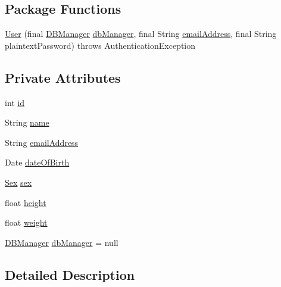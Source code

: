 \subsection*{Package Functions}
\begin{DoxyCompactItemize}
\item 
\hyperlink{classcom_1_1activitytracker_1_1_user_ae9f2a2555aa41e80ade28223907e01ab}{User} (final \hyperlink{classcom_1_1activitytracker_1_1_d_b_manager}{D\+B\+Manager} \hyperlink{classcom_1_1activitytracker_1_1_user_a8c8b36433447a235f2b4940b92e839c1}{db\+Manager}, final String \hyperlink{classcom_1_1activitytracker_1_1_user_ac2fdb9a858d0295e52c5f8bc179e3137}{email\+Address}, final String plaintext\+Password)  throws Authentication\+Exception
\end{DoxyCompactItemize}
\subsection*{Private Attributes}
\begin{DoxyCompactItemize}
\item 
int \hyperlink{classcom_1_1activitytracker_1_1_user_adc05319380c2cbb37477ab5aab86317c}{id}
\item 
String \hyperlink{classcom_1_1activitytracker_1_1_user_a49bfb4c8ebf8b7a377df01b5f0b2d7bc}{name}
\item 
String \hyperlink{classcom_1_1activitytracker_1_1_user_ac2fdb9a858d0295e52c5f8bc179e3137}{email\+Address}
\item 
Date \hyperlink{classcom_1_1activitytracker_1_1_user_a40b0d4ce16246066c0e948edef864d94}{date\+Of\+Birth}
\item 
\hyperlink{enumcom_1_1activitytracker_1_1_user_1_1_sex}{Sex} \hyperlink{classcom_1_1activitytracker_1_1_user_adcbddd2e965af4e227f7cf0582a3e13d}{sex}
\item 
float \hyperlink{classcom_1_1activitytracker_1_1_user_a83cdfe6f520a4e18e8710e8e11f8c3d6}{height}
\item 
float \hyperlink{classcom_1_1activitytracker_1_1_user_a8a30c6c08983e513b462bcc035434c9e}{weight}
\item 
\hyperlink{classcom_1_1activitytracker_1_1_d_b_manager}{D\+B\+Manager} \hyperlink{classcom_1_1activitytracker_1_1_user_a8c8b36433447a235f2b4940b92e839c1}{db\+Manager} = null
\end{DoxyCompactItemize}


\subsection{Detailed Description}


